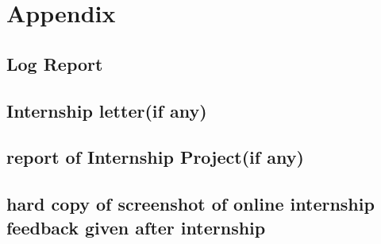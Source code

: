 \chapter{Appendix}

\section{Log Report}

\section{Internship letter(if any)}

\section{ report of Internship Project(if any)}

\section{hard copy of screenshot of online internship feedback given after internship}